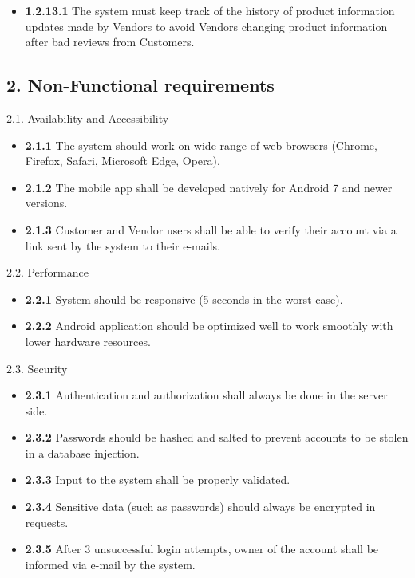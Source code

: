 \documentclass[]{article}
\providecommand{\tightlist}{%
  \setlength{\itemsep}{0pt}\setlength{\parskip}{0pt}}
\begin{document}
\begin{itemize}
          \begin{itemize}
              \tightlist
              \item
                    \textbf{1.2.13.1} The system must keep track of the history of
                    product information updates made by Vendors to avoid Vendors
                    changing product information after bad reviews from Customers.
          \end{itemize}
\end{itemize}

\hypertarget{non-functional-requirements}{%
    \subsection{2. Non-Functional
        requirements}\label{non-functional-requirements}}

2.1. Availability and Accessibility

\begin{itemize}
    \tightlist
    \item
          \textbf{2.1.1} The system should work on wide range of web browsers
          (Chrome, Firefox, Safari, Microsoft Edge, Opera).
    \item
          \textbf{2.1.2} The mobile app shall be developed natively for Android
          7 and newer versions.
    \item
          \textbf{2.1.3} Customer and Vendor users shall be able to verify their
          account via a link sent by the system to their e-mails.
\end{itemize}

2.2. Performance

\begin{itemize}
    \tightlist
    \item
          \textbf{2.2.1} System should be responsive (5 seconds in the worst
          case).
    \item
          \textbf{2.2.2} Android application should be optimized well to work
          smoothly with lower hardware resources.
\end{itemize}

2.3. Security

\begin{itemize}
    \tightlist
    \item
          \textbf{2.3.1} Authentication and authorization shall always be done
          in the server side.
    \item
          \textbf{2.3.2} Passwords should be hashed and salted to prevent
          accounts to be stolen in a database injection.
    \item
          \textbf{2.3.3} Input to the system shall be properly validated.
    \item
          \textbf{2.3.4} Sensitive data (such as passwords) should always be
          encrypted in requests.
    \item
          \textbf{2.3.5} After 3 unsuccessful login attempts, owner of the
          account shall be informed via e-mail by the system.
\end{itemize}
\end{document}
